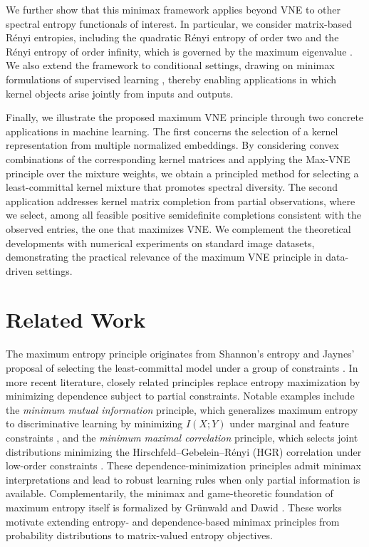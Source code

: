 \documentclass{article}
\theoremstyle{plain}
\theoremstyle{definition}
\begin{document}
We further show that this minimax framework applies beyond VNE to other spectral entropy functionals of interest. In particular, we consider matrix-based R\'enyi entropies, including the quadratic R\'enyi entropy of order two and the R\'enyi entropy of order infinity, which is governed by the maximum eigenvalue \cite{Renyi1961,SanchezGiraldoRaoPrincipe2015}. We also extend the framework to conditional settings, drawing on minimax formulations of supervised learning \cite{FarniaTse2016Minimax}, thereby enabling applications in which kernel objects arise jointly from inputs and outputs.

Finally, we illustrate the proposed maximum VNE principle through two concrete applications in machine learning. The first concerns the selection of a kernel representation from multiple normalized embeddings. By considering convex combinations of the corresponding kernel matrices and applying the Max-VNE principle over the mixture weights, we obtain a principled method for selecting a least-committal kernel mixture that promotes spectral diversity. The second application addresses kernel matrix completion from partial observations, where we select, among all feasible positive semidefinite completions consistent with the observed entries, the one that maximizes VNE. We complement the theoretical developments with numerical experiments on standard image datasets, demonstrating the practical relevance of the maximum VNE principle in data-driven settings.

\section{Related Work}
The maximum entropy principle originates from Shannon’s entropy \cite{Shannon1948} and Jaynes’ proposal of selecting the least-committal model under a group of constraints \cite{Jaynes1957}. In more recent literature, closely related principles replace entropy maximization by minimizing dependence subject to partial constraints. Notable examples include the \emph{minimum mutual information} principle, which generalizes maximum entropy to discriminative learning by minimizing $I(X;Y)$ under marginal and feature constraints \cite{GlobersonTishby2004MinMI}, and the \emph{minimum maximal correlation} principle, which selects joint distributions minimizing the Hirschfeld--Gebelein--R\'enyi (HGR) correlation under low-order constraints \cite{FarniaRazaviyaynKannanTse2015MinHGR,RazaviyaynFarniaTse2015DiscreteRenyi}. These dependence-minimization principles admit minimax interpretations and lead to robust learning rules when only partial information is available. Complementarily, the minimax and game-theoretic foundation of maximum entropy itself is formalized by Gr{\"u}nwald and Dawid \cite{GrunwaldDawid2004}. These works motivate extending entropy- and dependence-based minimax principles from probability distributions to matrix-valued entropy objectives.
\end{document}
